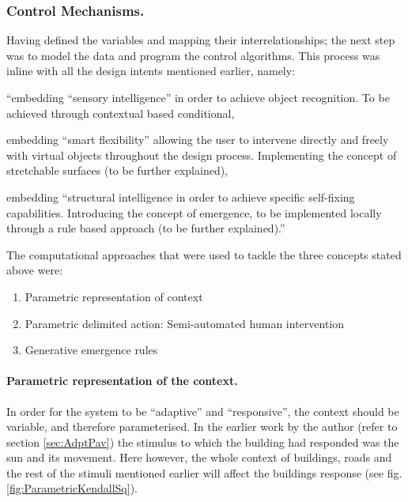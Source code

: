 \subsubsection{Control Mechanisms.}

Having defined the variables and mapping their interrelationships; the next step was to model the data and program the control algorithms. This process was inline with all the design intents mentioned earlier, namely: 
\begin{inparaenum}
\item ``embedding ``sensory intelligence'' in order to achieve object recognition. To be achieved through contextual based conditional,
\item embedding ``smart flexibility'' allowing the user to intervene directly and freely with virtual objects throughout the design process. Implementing the concept of stretchable surfaces (to be further explained),
\item embedding ``structural intelligence in order to achieve specific self-fixing capabilities. Introducing the concept of emergence, to be implemented locally through a rule based approach (to be further explained).''
\end{inparaenum} \cite{zulas04}

The computational approaches that were used to tackle the three concepts stated above were: 

\begin{enumerate}[nolistsep]
\item Parametric representation of context
\item Parametric delimited action: Semi-automated human intervention
\item Generative emergence rules
\end{enumerate}

\paragraph{Parametric representation of the context.}\mbox{}
In order for the system to be ``adaptive'' and ``responsive'', the context should be variable, and therefore parameterised. In the earlier work by the author (refer to section \ref{sec:AdptPav}) the stimulus to which the building had responded was the sun and its movement. Here however, the whole context of buildings, roads and the rest of the stimuli mentioned earlier will affect the buildings response (see fig. \ref{fig:ParametricKendallSq}).

